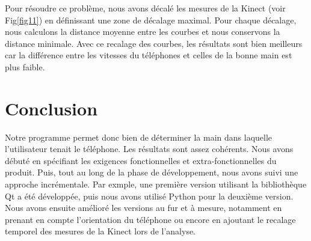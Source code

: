 \documentclass[12pt, french]{article}
\begin{document}
Pour résoudre ce problème, nous avons décalé les mesures de la Kinect (voir Fig\ref{fig11}) en définissant une zone de décalage maximal. Pour chaque décalage, nous calculons la distance moyenne entre les courbes et nous conservons la distance minimale. Avec ce recalage des courbes, les résultats sont bien meilleurs car la différence entre les vitesses du téléphones et celles de la bonne main est plus faible.


\section{Conclusion}
Notre programme permet donc bien de déterminer la main dans laquelle l'utilisateur tenait le téléphone. Les résultats sont assez cohérents. Nous avons débuté en spécifiant les exigences fonctionnelles et extra-fonctionnelles du produit. Puis, tout au long de la phase de développement, nous avons suivi une approche incrémentale. Par exmple, une première version utilisant la bibliothèque Qt a été développée, puis nous avons utilisé Python pour la deuxième version. Nous avons ensuite amélioré les versions au fur et à mesure, notamment en prenant en compte l'orientation du téléphone ou encore en ajoutant le recalage temporel des mesures de la Kinect lors de l'analyse.
\end{document}
